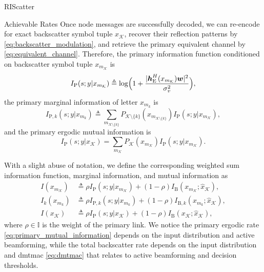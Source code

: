 \documentclass[journal]{IEEEtran}
\begin{document}
\begin{section}{RIScatter}
\begin{subsection}{Achievable Rates}
		Once node messages are successfully decoded, we can re-encode for exact backscatter symbol tuple $x_{\mathcal{K}}$, recover their reflection patterns by \eqref{eq:backscatter_modulation}, and retrieve the primary equivalent channel by \eqref{eq:equivalent_channel}.
		Therefore, the primary information function conditioned on backscatter symbol tuple $x_{m_{\mathcal{K}}}$ is
		\begin{equation}
			I_{\mathrm{P}}(s;y|x_{m_{\mathcal{K}}}) \triangleq \log \Bigl(1 + \frac{\lvert \boldsymbol{h}_{\mathrm{E}}^H(x_{m_{\mathcal{K}}}) \boldsymbol{w} \rvert^2}{\sigma_v^2}\Bigr),
			\label{eq:primary_information_function}
		\end{equation}
		the primary marginal information of letter $x_{m_k}$ is
		\begin{equation}
			I_{\mathrm{P},k}(s;y|x_{m_k}) \triangleq \sum_{m_{\mathcal{K} \setminus \{k\}}} P_{\mathcal{K} \setminus \{k\}}(x_{m_{\mathcal{K} \setminus \{k\}}}) I_{\mathrm{P}}(s;y|x_{m_{\mathcal{K}}}),
			\label{eq:primary_marginal_information}
		\end{equation}
		and the primary ergodic mutual information is
		\begin{equation}
			I_{\mathrm{P}}(s;y|x_{\mathcal{K}}) = \sum_{m_{\mathcal{K}}} P_{\mathcal{K}}(x_{m_{\mathcal{K}}}) I_{\mathrm{P}}(s;y|x_{m_{\mathcal{K}}}).
			\label{eq:primary_mutual_information}
		\end{equation}

		With a slight abuse of notation, we define the corresponding weighted sum information function, marginal information, and mutual information as
		\begin{align}
			I(x_{m_{\mathcal{K}}})
			 & \triangleq \rho I_{\mathrm{P}}(s;y|x_{m_{\mathcal{K}}}) + (1 - \rho) I_{\mathrm{B}}(x_{m_{\mathcal{K}}};\hat{x}_{\mathcal{K}}),\label{eq:weighted_sum_information_function} \\
			I_k(x_{m_k})
			 & \triangleq \rho I_{\mathrm{P},k}(s;y|x_{m_k}) + (1 - \rho) I_{\mathrm{B},k}(x_{m_k};\hat{x}_{\mathcal{K}}),\label{eq:weighted_sum_marginal_information}                     \\
			I(x_{\mathcal{K}})
			 & \triangleq \rho I_{\mathrm{P}}(s;y|x_{\mathcal{K}}) + (1 - \rho) I_{\mathrm{B}}(x_{\mathcal{K}};\hat{x}_{\mathcal{K}}),\label{eq:weighted_sum_mutual_information}
		\end{align}
		where $\rho \in \mathbb{I}$ is the weight of the primary link.
		We notice the primary ergodic rate \eqref{eq:primary_mutual_information} depends on the input distribution and active beamforming, while the total backscatter rate depends on the input distribution and \gls{dmtmac} \eqref{eq:dmtmac} that relates to active beamforming and decision thresholds.
		\label{st:information_theory}
	\end{subsection}
	\label{st:riscatter}
\end{section}
\end{document}

